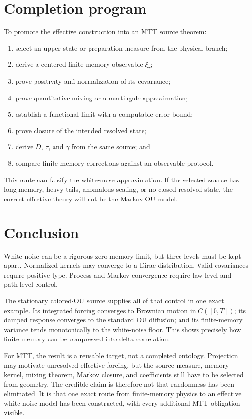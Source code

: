 \documentclass[11pt]{article}
\begin{document}
\section{Completion program}

To promote the effective construction into an MTT source theorem:
\begin{enumerate}
\item select an upper state or preparation measure from the physical branch;
\item derive a centered finite-memory observable \(\xi_\tau\);
\item prove positivity and normalization of its covariance;
\item prove quantitative mixing or a martingale approximation;
\item establish a functional limit with a computable error bound;
\item prove closure of the intended resolved state;
\item derive \(D\), \(\tau\), and \(\gamma\) from the same source; and
\item compare finite-memory corrections against an observable protocol.
\end{enumerate}

This route can falsify the white-noise approximation. If the selected source
has long memory, heavy tails, anomalous scaling, or no closed resolved state,
the correct effective theory will not be the Markov OU model.

\section{Conclusion}

White noise can be a rigorous zero-memory limit, but three levels must be kept
apart. Normalized kernels may converge to a Dirac distribution. Valid
covariances require positive type. Process and Markov convergence require
law-level and path-level control.

The stationary colored-OU source supplies all of that control in one exact
example. Its integrated forcing converges to Brownian motion in
\(C([0,T])\); its damped response converges to the standard OU diffusion; and
its finite-memory variance tends monotonically to the white-noise floor. This
shows precisely how finite memory can be compressed into delta correlation.

For MTT, the result is a reusable target, not a completed ontology. Projection
may motivate unresolved effective forcing, but the source measure, memory
kernel, mixing theorem, Markov closure, and coefficients still have to be
selected from geometry. The credible claim is therefore not that randomness
has been eliminated. It is that one exact route from finite-memory physics to
an effective white-noise model has been constructed, with every additional
MTT obligation visible.
\end{document}

